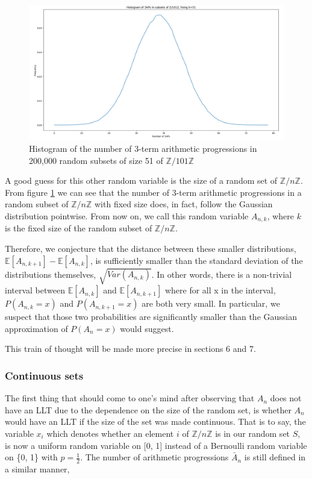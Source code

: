 \documentclass[12pt]{article} %
\newcommand{\E}{\mathbb{E}}
\newcommand{\Z}{\mathbb{Z}}
\theoremstyle{definition}
\theoremstyle{remark}
\begin{document}
\begin{figure}[h]
	\centering
    \includegraphics[scale=0.25]{3ap-fixed-k}
    \caption{Histogram of the number of 3-term arithmetic progressions in 200,000 random subsets of size 51 of $\Z / 101\Z$}
    \label{fig:3ap-k}
\end{figure}

A good guess for this other random variable is the size of a random set of $\Z / n\Z$. From figure \ref{fig:3ap-k} we can see that the number of 3-term arithmetic progressions in a random subset of $\Z / n \Z$ with fixed size does, in fact, follow the Gaussian distribution pointwise. From now on, we call this random variable $A_{n, k}$, where $k$ is the fixed size of the random subset of $\Z / n\Z$.

Therefore, we conjecture that the distance between these smaller distributions, $\E[A_{n,k+1}]-\E[A_{n,k}]$, is sufficiently smaller than the standard deviation of the distributions themselves, $\sqrt{Var(A_{n, k})}$. In other words, there is a non-trivial interval between $\E[A_{n, k}]$ and $\E[A_{n, k+1}]$ where for all x in the interval, $P(A_{n, k}=x)$ and $P(A_{n, k+1} = x)$ are both very small. In particular, we suspect that those two probabilities are significantly smaller than the Gaussian approximation of $P(A_n = x)$ would suggest.

This train of thought will be made more precise in sections 6 and 7.

\subsubsection{Continuous sets}

The first thing that should come to one's mind after observing that $A_n$ does not have an LLT due to the dependence on the size of the random set, is whether $A_n$ would have an LLT if the size of the set was made continuous. That is to say, the variable $x_i$ which denotes whether an element $i$ of $\Z / n\Z$ is in our random set $S$, is now a uniform random variable on [0, 1] instead of a Bernoulli random variable on \{0, 1\} with $p=\frac{1}{2}$. The number of arithmetic progressions $\bar{A}_n$ is still defined in a similar manner,
\end{document}

